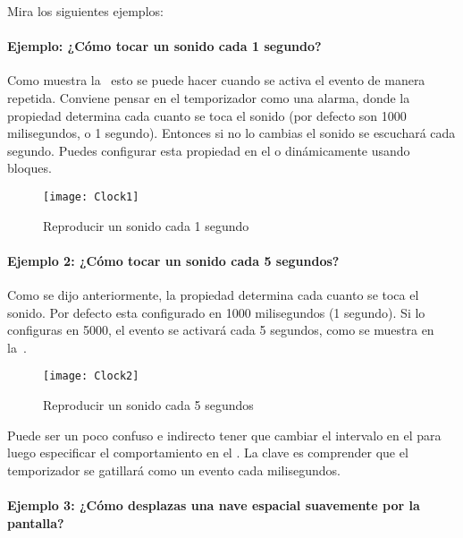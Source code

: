 {{Mira los siguientes ejemplos:

\paragraph{Ejemplo: ¿Cómo tocar un sonido cada 1 segundo?}

Como muestra la~ esto se puede hacer cuando se activa
el evento  de manera repetida. Conviene
pensar en el temporizador como una alarma, donde la propiedad
 determina cada cuanto se toca el
sonido (por defecto son 1000 milisegundos, o 1 segundo). Entonces si
no lo cambias el sonido se escuchará cada segundo. Puedes configurar
esta propiedad en el \designer o dinámicamente usando bloques.

\begin{figure}[H]
\centering
\texttt{[image: Clock1]}
\caption{Reproducir un sonido cada 1 segundo}
\label{fig:Clock1}
\end{figure}

\paragraph{Ejemplo 2: ¿Cómo tocar un sonido cada 5 segundos?}

Como se dijo anteriormente, la propiedad  determina cada cuanto se toca el
sonido. Por defecto esta configurado en 1000 milisegundos (1 segundo).
Si lo configuras en 5000, el evento  se activará cada 5
segundos, como se muestra en la~.

\begin{figure}[H]
\centering
\texttt{[image: Clock2]}
\caption{Reproducir un sonido cada 5 segundos}
\label{fig:Clock2}
\end{figure}

Puede ser un poco confuso e indirecto tener que cambiar el intervalo
en el \designer para luego especificar el comportamiento en el
\blockEditor. La clave es comprender que el temporizador se gatillará
como un evento cada 
milisegundos.

\paragraph{Ejemplo 3: ¿Cómo desplazas una nave espacial suavemente por la pantalla?}

}}
